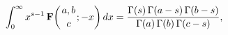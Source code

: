 \[\int_{0}^{\infty}x^{s-1}\mathop{\mathbf{F}\/}\nolimits\!\left({a,b\atop c};-x%
\right)dx=\frac{\mathop{\Gamma\/}\nolimits\!\left(s\right)\mathop{\Gamma\/}%
\nolimits\!\left(a-s\right)\mathop{\Gamma\/}\nolimits\!\left(b-s\right)}{%
\mathop{\Gamma\/}\nolimits\!\left(a\right)\mathop{\Gamma\/}\nolimits\!\left(b%
\right)\mathop{\Gamma\/}\nolimits\!\left(c-s\right)},\]